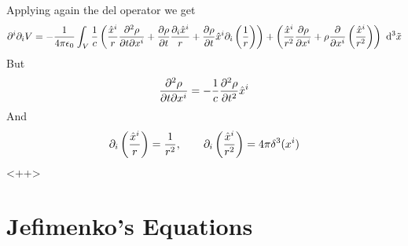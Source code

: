 \documentclass[../electromagnetism.tex]{subfiles}
\begin{document}
Applying again the del operator we get
\begin{equation*}
	\partial^i\partial_iV=-\frac{1}{4\pi\epsilon_0}\int_{V}^{}\frac{1}{c}\left( \frac{\hat{x}^i}{r}\pdv[2]{\rho}{t}{x^i}+\pdv{\rho}{t}\frac{\partial_i\hat{x}^i}{r}+\pdv{\rho}{t}\hat{x}^i\partial_i\left( \frac{1}{r} \right) \right) +\left( \frac{\hat{x}^i}{r^2}\pdv{\rho}{x^i}+\rho\pdv{x^i}\left( \frac{\hat{x}^i}{r^2} \right) \right)\ \mathrm{d}^3{\tilde{x}}
\end{equation*}
But
\begin{equation*}
	\pdv[2]{\rho}{t}{x^i}=-\frac{1}{c}\pdv[2]{\rho}{t}\hat{x}^i
\end{equation*}
And
\begin{equation*}
	\partial_i\left( \frac{\hat{x}^i}{r} \right)=\frac{1}{r^2},\qquad\partial_i\left( \frac{\hat{x}^i}{r^2} \right)=4\pi\delta^3(x^i)
\end{equation*}
<++>
\section{Jefimenko's Equations}
\end{document}
